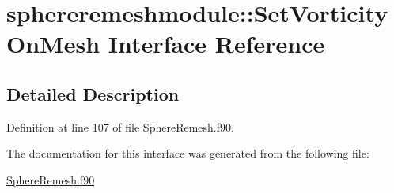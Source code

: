 \hypertarget{interfacesphereremeshmodule_1_1_set_vorticity_on_mesh}{\section{sphereremeshmodule\+:\+:Set\+Vorticity\+On\+Mesh Interface Reference}
\label{interfacesphereremeshmodule_1_1_set_vorticity_on_mesh}
}


\subsection{Detailed Description}


Definition at line 107 of file Sphere\+Remesh.\+f90.



The documentation for this interface was generated from the following file\+:\begin{DoxyCompactItemize}
\item 
\hyperlink{_sphere_remesh_8f90}{Sphere\+Remesh.\+f90}\end{DoxyCompactItemize}

